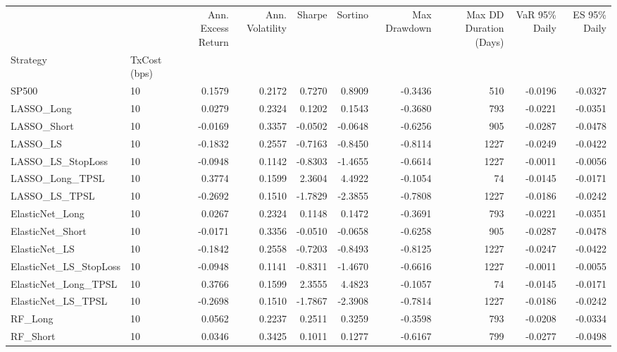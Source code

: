 \begin{tabular}{llrrrrrrrr}
\toprule
 &  & Ann. Excess Return & Ann. Volatility & Sharpe & Sortino & Max Drawdown & Max DD Duration (Days) & VaR 95\% Daily & ES 95\% Daily \\
Strategy & TxCost (bps) &  &  &  &  &  &  &  &  \\
\midrule
SP500 & 10 & 0.1579 & 0.2172 & 0.7270 & 0.8909 & -0.3436 & 510 & -0.0196 & -0.0327 \\
\cline{1-10}
LASSO\_Long & 10 & 0.0279 & 0.2324 & 0.1202 & 0.1543 & -0.3680 & 793 & -0.0221 & -0.0351 \\
\cline{1-10}
LASSO\_Short & 10 & -0.0169 & 0.3357 & -0.0502 & -0.0648 & -0.6256 & 905 & -0.0287 & -0.0478 \\
\cline{1-10}
LASSO\_LS & 10 & -0.1832 & 0.2557 & -0.7163 & -0.8450 & -0.8114 & 1227 & -0.0249 & -0.0422 \\
\cline{1-10}
LASSO\_LS\_StopLoss & 10 & -0.0948 & 0.1142 & -0.8303 & -1.4655 & -0.6614 & 1227 & -0.0011 & -0.0056 \\
\cline{1-10}
LASSO\_Long\_TPSL & 10 & 0.3774 & 0.1599 & 2.3604 & 4.4922 & -0.1054 & 74 & -0.0145 & -0.0171 \\
\cline{1-10}
LASSO\_LS\_TPSL & 10 & -0.2692 & 0.1510 & -1.7829 & -2.3855 & -0.7808 & 1227 & -0.0186 & -0.0242 \\
\cline{1-10}
ElasticNet\_Long & 10 & 0.0267 & 0.2324 & 0.1148 & 0.1472 & -0.3691 & 793 & -0.0221 & -0.0351 \\
\cline{1-10}
ElasticNet\_Short & 10 & -0.0171 & 0.3356 & -0.0510 & -0.0658 & -0.6258 & 905 & -0.0287 & -0.0478 \\
\cline{1-10}
ElasticNet\_LS & 10 & -0.1842 & 0.2558 & -0.7203 & -0.8493 & -0.8125 & 1227 & -0.0247 & -0.0422 \\
\cline{1-10}
ElasticNet\_LS\_StopLoss & 10 & -0.0948 & 0.1141 & -0.8311 & -1.4670 & -0.6616 & 1227 & -0.0011 & -0.0055 \\
\cline{1-10}
ElasticNet\_Long\_TPSL & 10 & 0.3766 & 0.1599 & 2.3555 & 4.4823 & -0.1057 & 74 & -0.0145 & -0.0171 \\
\cline{1-10}
ElasticNet\_LS\_TPSL & 10 & -0.2698 & 0.1510 & -1.7867 & -2.3908 & -0.7814 & 1227 & -0.0186 & -0.0242 \\
\cline{1-10}
RF\_Long & 10 & 0.0562 & 0.2237 & 0.2511 & 0.3259 & -0.3598 & 793 & -0.0208 & -0.0334 \\
\cline{1-10}
RF\_Short & 10 & 0.0346 & 0.3425 & 0.1011 & 0.1277 & -0.6167 & 799 & -0.0277 & -0.0498 \\
\cline{1-10}

\end{tabular}
